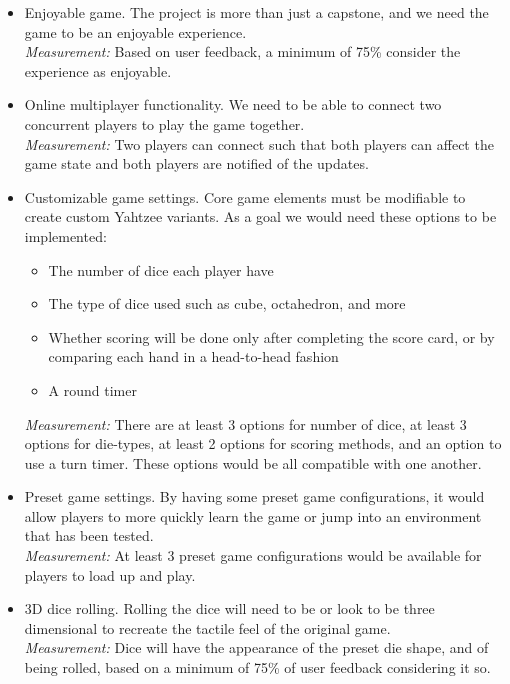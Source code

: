 \documentclass{article}
\begin{document}
\begin{itemize}
	\item Enjoyable game. The project is more than just a capstone, and we need the game to be an enjoyable experience.\\
	\textit{Measurement:} Based on user feedback, a minimum of 75\% consider the experience as enjoyable.

	\item Online multiplayer functionality. We need to be able to connect two concurrent players to play the game together.\\
	\textit{Measurement:} Two players can connect such that both players can affect the game state and both players are notified of the updates.
	
	\item Customizable game settings. Core game elements must be modifiable to create custom Yahtzee variants. As a goal we would need these options to be implemented:
	\begin{itemize}
        \item The number of dice each player have
        \item The type of dice used such as cube, octahedron, and more
        \item Whether scoring will be done only after completing the score card, or by comparing each hand in a head-to-head fashion
        \item A round timer
    \end{itemize}
	\textit{Measurement:} There are at least 3 options for number of dice, at least 3 options for die-types, at least 2 options for scoring methods, and an option to use a turn timer. These options would be all compatible with one another.
	
	\item Preset game settings. By having some preset game configurations, it would allow players to more quickly learn the game or jump into an environment that has been tested.\\
	\textit{Measurement:} At least 3 preset game configurations would be available for players to load up and play.
	
	\item 3D dice rolling. Rolling the dice will need to be or look to be three dimensional to recreate the tactile feel of the original game.\\
	\textit{Measurement:} Dice will have the appearance of the preset die shape, and of being rolled, based on a minimum of 75\% of user feedback considering it so.
	
\end{itemize}
\end{document}
